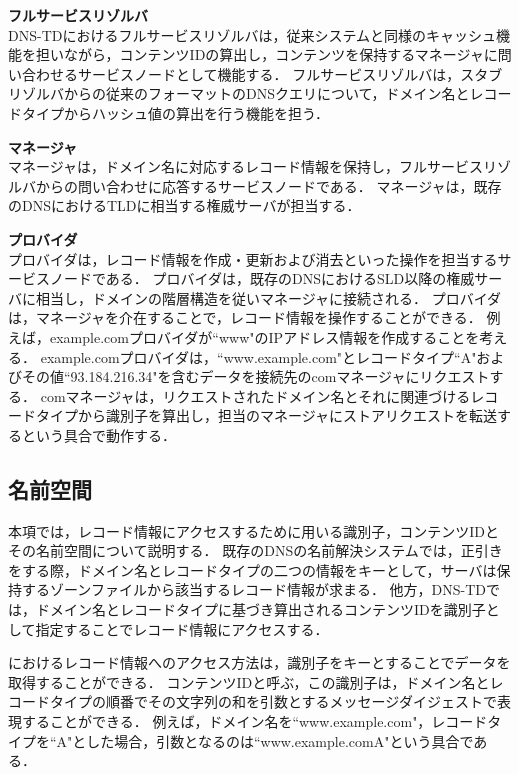 \hspace{-12pt}\textbf{フルサービスリゾルバ}\\
DNS-TDにおけるフルサービスリゾルバは，従来システムと同様のキャッシュ機能を担いながら，コンテンツIDの算出し，コンテンツを保持するマネージャに問い合わせるサービスノードとして機能する．
フルサービスリゾルバは，スタブリゾルバからの従来のフォーマットのDNSクエリについて，ドメイン名とレコードタイプからハッシュ値の算出を行う機能を担う．


\newpage
\hspace{-12pt}\textbf{マネージャ}\\
マネージャは，ドメイン名に対応するレコード情報を保持し，フルサービスリゾルバからの問い合わせに応答するサービスノードである．
マネージャは，既存のDNSにおけるTLDに相当する権威サーバが担当する．


\hspace{-12pt}\textbf{プロバイダ}\\
プロバイダは，レコード情報を作成・更新および消去といった操作を担当するサービスノードである．
プロバイダは，既存のDNSにおけるSLD以降の権威サーバに相当し，ドメインの階層構造を従いマネージャに接続される．
プロバイダは，マネージャを介在することで，レコード情報を操作することができる．
例えば，example.comプロバイダが``www"のIPアドレス情報を作成することを考える．
example.comプロバイダは，``www.example.com"とレコードタイプ``A"およびその値``93.184.216.34"を含むデータを接続先のcomマネージャにリクエストする．
comマネージャは，リクエストされたドメイン名とそれに関連づけるレコードタイプから識別子を算出し，担当のマネージャにストアリクエストを転送するという具合で動作する．

\newpage
\subsection{名前空間}
本項では，レコード情報にアクセスするために用いる識別子，コンテンツIDとその名前空間について説明する．
既存のDNSの名前解決システムでは，正引きをする際，ドメイン名とレコードタイプの二つの情報をキーとして，サーバは保持するゾーンファイルから該当するレコード情報が求まる．
他方，DNS-TDでは，ドメイン名とレコードタイプに基づき算出されるコンテンツIDを識別子として指定することでレコード情報にアクセスする．

におけるレコード情報へのアクセス方法は，識別子をキーとすることでデータを取得することができる．
コンテンツIDと呼ぶ，この識別子は，ドメイン名とレコードタイプの順番でその文字列の和を引数とするメッセージダイジェストで表現することができる．
例えば，ドメイン名を``www.example.com"，レコードタイプを``A"とした場合，引数となるのは``www.example.comA"という具合である．

